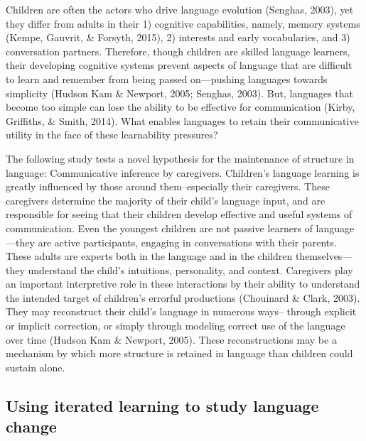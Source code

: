 \documentclass[10pt, letterpaper]{article}
\begin{document}
Children are often the actors who drive language evolution (Senghas,
2003), yet they differ from adults in their 1) cognitive capabilities,
namely, memory systems (Kempe, Gauvrit, \& Forsyth, 2015), 2) interests
and early vocabularies, and 3) conversation partners. Therefore, though
children are skilled language learners, their developing cognitive
systems prevent aspects of language that are difficult to learn and
remember from being passed on---pushing languages towards simplicity
(Hudson Kam \& Newport, 2005; Senghas, 2003). But, languages that become
too simple can lose the ability to be effective for communication
(Kirby, Griffiths, \& Smith, 2014). What enables languages to retain
their communicative utility in the face of these learnability pressures?

The following study tests a novel hypothesis for the maintenance of
structure in language: Communicative inference by caregivers. Children's
language learning is greatly influenced by those around them--especially
their caregivers. These caregivers determine the majority of their
child's language input, and are responsible for seeing that their
children develop effective and useful systems of communication. Even the
youngest children are not passive learners of language---they are active
participants, engaging in conversations with their parents. These adults
are experts both in the language and in the children themselves---they
understand the child's intuitions, personality, and context. Caregivers
play an important interpretive role in these interactions by their
ability to understand the intended target of children's errorful
productions (Chouinard \& Clark, 2003). They may reconstruct their
child's language in numerous ways-- through explicit or implicit
correction, or simply through modeling correct use of the language over
time (Hudson Kam \& Newport, 2005). These reconstructions may be a
mechanism by which more structure is retained in language than children
could sustain alone.

\subsection{Using iterated learning to study language
change}\label{using-iterated-learning-to-study-language-change}
\end{document}
